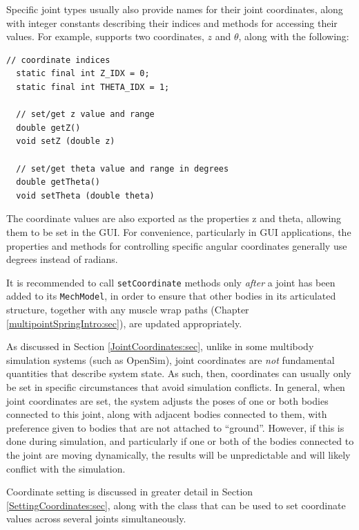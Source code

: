 Specific joint types usually also provide names for their joint
coordinates, along with integer constants describing their indices
and methods for accessing their values. For example,
supports two coordinates, $z$ and $\theta$, along with
the following:
%
\begin{lstlisting}[]
  // coordinate indices
  static final int Z_IDX = 0;
  static final int THETA_IDX = 1;

  // set/get z value and range
  double getZ()
  void setZ (double z)

  // set/get theta value and range in degrees
  double getTheta()
  void setTheta (double theta)
\end{lstlisting}
%
The coordinate values are also exported as the properties {\sf z} and
{\sf theta}, allowing them to be set in the GUI. For convenience,
particularly in GUI applications, the properties and methods for
controlling specific angular coordinates generally use degrees instead
of radians.

\begin{sideblock}
It is recommended to call {\tt setCoordinate} methods only {\it after} a joint
has been added to its {\tt MechModel}, in order to ensure that other bodies in
its articulated structure, together with any muscle wrap paths
(Chapter \ref{multipointSpringIntro:sec}), are updated appropriately.
\end{sideblock}

As discussed in Section \ref{JointCoordinates:sec}, unlike in some
multibody simulation systems (such as OpenSim), joint coordinates are
{\it not} fundamental quantities that describe system state. As such,
then, coordinates can usually only be set in specific circumstances
that avoid simulation conflicts. In general, when joint coordinates
are set, the system adjusts the poses of one or both bodies connected
to this joint, along with adjacent bodies connected to them, with
preference given to bodies that are not attached to ``ground''.
However, if this is done during simulation, and particularly if one or
both of the bodies connected to the joint are moving dynamically, the
results will be unpredictable and will likely conflict with the
simulation.

\begin{sideblock}
Coordinate setting is discussed in greater detail in Section
\ref{SettingCoordinates:sec}, along with the
 class that can be 
used to set coordinate values across several joints simultaneously.
\end{sideblock}


